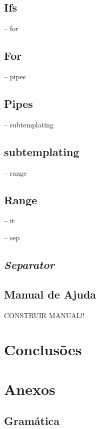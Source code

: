 \documentclass[runningheads]{llncs}
\begin{document}
\subsection{Ifs}

-- for
\subsection{For}

-- pipes
\subsection{Pipes}

-- subtemplating
\subsection{subtemplating}

-- range
\subsection{Range}

-- it 

-- sep 
\subsection{\textit{Separator}}


\subsection{Manual de Ajuda}
CONSTRUIR MANUAL!!

\section{Conclusões}



\section{Anexos}\label{sec:anexos}

\subsection{Gramática} \label{fig:grammar}
\inputminted{bash}{assets/gramatica.txt}

%
%
%
% 
% 


\end{document}
